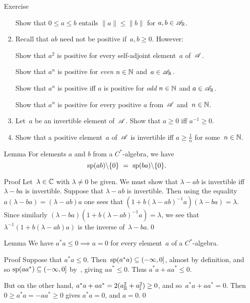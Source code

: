 \documentclass[main]{subfiles}
\begin{document}
\begin{parsec}
\begin{point}{Exercise}
\begin{enumerate}
Show that $0\leq a \leq b$ entails $\|a\|\leq \|b\|$
for $a,b\in\mathscr{A}_{\mathbb{R}}$.

\item 
Recall that $ab$ need not be positive if~$a,b\geq 0$. However:

Show that $a^2$ is positive for every self-adjoint element~$a$ of~$\mathscr{A}$.

Show that $a^n$ is positive for \emph{even} $n\in \mathbb{N}$ and~$a\in\mathscr{A}_{\mathbb{R}}$.

Show that $a^n$ is positive iff $a$ is positive for \emph{odd} $n\in \mathbb{N}$
and $a\in\mathscr{A}_{\mathbb{R}}$.

Show that $a^n$ is positive
for every positive $a$ from~$\mathscr{A}$ and~$n\in \mathbb{N}$.
\item
Let~$a$ be an invertible element of~$\mathscr{A}$.
Show that $a\geq 0$ iff $a^{-1}\geq 0$.

\item
Show that a positive element~$a$ of~$\mathscr{A}$ is invertible
iff $a\geq \frac{1}{n}$ for some~$n\in \mathbb{N}$.
\end{enumerate}
\end{point}
\begin{point}{Lemma}%
For elements $a$ and $b$ from a $C^*$-algebra,
we have
\begin{equation*}
\spec(ab)\backslash\{0\}\ =\ \spec(ba)\backslash\{0\}.
\end{equation*}
\begin{point}{Proof}%
Let~$\lambda\in \mathbb{C}$ with $\lambda\neq 0$ be given.
We must show that $\lambda - ab$ is invertible
iff $\lambda - ba$ is invertible.
Suppose that $\lambda-ab$ is invertible.
Then using the equality$a(\lambda-ba)=(\lambda-ab)a$
one sees that $(1+b(\lambda-ab)^{-1}a)(\lambda-ba)=\lambda$.
Since similarly $(\lambda-ba)(1+b(\lambda-ab)^{-1}a)=\lambda$,
we see that $\lambda^{-1}(1+b(\lambda-ab)a)$
is the inverse of~$\lambda-ba$.\qed
\end{point}
\end{point}
\begin{point}{Lemma}%
We have $a^*a  \leq 0\implies a=0$
for every element~$a$ of a $C^*$-algebra.
\begin{point}{Proof}%
Suppose that $a^*a\leq 0$.
Then~$\mathrm{sp}(a^*a)\subseteq (-\infty,0]$, almost by definition,
and so $\mathrm{sp}(aa^*)\subseteq (-\infty,0]$ by~,
giving $aa^*\leq 0$.
Thus $a^*a+aa^*\leq 0$.

But on the other hand, 
$a^*a+aa^* = 2(a_{\mathbb{R}}^2 + a_{\mathbb{I}}^2) \geq 0$,
and so~$a^*a+aa^*=0$.
Then $0\geq a^*a=-aa^*\geq 0$ gives $a^*a=0$,
and $a=0$.\qed
\end{point}
\end{point}
\end{parsec}
\end{document}
